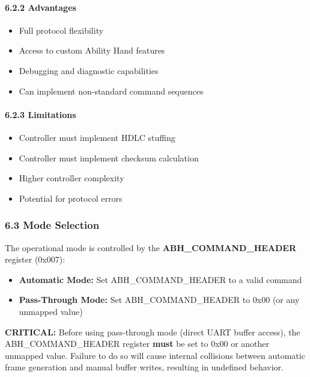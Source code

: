 \documentclass[
  11pt,
]{article}
\providecommand{\tightlist}{%
  \setlength{\itemsep}{0pt}\setlength{\parskip}{0pt}}
\begin{document}
\paragraph{6.2.2 Advantages}\label{advantages-1}

\begin{itemize}
\tightlist
\item
  Full protocol flexibility
\item
  Access to custom Ability Hand features
\item
  Debugging and diagnostic capabilities
\item
  Can implement non-standard command sequences
\end{itemize}

\paragraph{6.2.3 Limitations}\label{limitations-1}

\begin{itemize}
\tightlist
\item
  Controller must implement HDLC stuffing
\item
  Controller must implement checksum calculation
\item
  Higher controller complexity
\item
  Potential for protocol errors
\end{itemize}

\subsubsection{6.3 Mode Selection}\label{mode-selection}

The operational mode is controlled by the \textbf{ABH\_COMMAND\_HEADER}
register (0x007):

\begin{itemize}
\tightlist
\item
  \textbf{Automatic Mode:} Set ABH\_COMMAND\_HEADER to a valid command
\item
  \textbf{Pass-Through Mode:} Set ABH\_COMMAND\_HEADER to 0x00 (or any
  unmapped value)
\end{itemize}

\textbf{CRITICAL:} Before using pass-through mode (direct UART buffer
access), the ABH\_COMMAND\_HEADER register \textbf{must} be set to 0x00
or another unmapped value. Failure to do so will cause internal
collisions between automatic frame generation and manual buffer writes,
resulting in undefined behavior.
\end{document}
